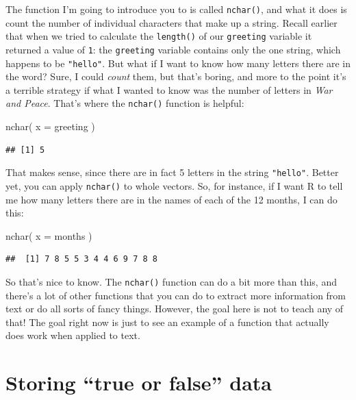 \documentclass[
]{book}
\newenvironment{Shaded}{\begin{snugshade}}{\end{snugshade}}
\newcommand{\AttributeTok}[1]{\textcolor[rgb]{0.77,0.63,0.00}{#1}}
\newcommand{\FunctionTok}[1]{\textcolor[rgb]{0.00,0.00,0.00}{#1}}
\newcommand{\NormalTok}[1]{#1}
\begin{document}
The function I'm going to introduce you to is called \texttt{nchar()}, and what it does is count the number of individual characters that make up a string. Recall earlier that when we tried to calculate the \texttt{length()} of our \texttt{greeting} variable it returned a value of \texttt{1}: the \texttt{greeting} variable contains only the one string, which happens to be \texttt{"hello"}. But what if I want to know how many letters there are in the word? Sure, I could \emph{count} them, but that's boring, and more to the point it's a terrible strategy if what I wanted to know was the number of letters in \emph{War and Peace}. That's where the \texttt{nchar()} function is helpful:

\begin{Shaded}
\begin{Highlighting}[]
\FunctionTok{nchar}\NormalTok{( }\AttributeTok{x =}\NormalTok{ greeting )}
\end{Highlighting}
\end{Shaded}

\begin{verbatim}
## [1] 5
\end{verbatim}

That makes sense, since there are in fact 5 letters in the string \texttt{"hello"}. Better yet, you can apply \texttt{nchar()} to whole vectors. So, for instance, if I want R to tell me how many letters there are in the names of each of the 12 months, I can do this:

\begin{Shaded}
\begin{Highlighting}[]
\FunctionTok{nchar}\NormalTok{( }\AttributeTok{x =}\NormalTok{ months )}
\end{Highlighting}
\end{Shaded}

\begin{verbatim}
##  [1] 7 8 5 5 3 4 4 6 9 7 8 8
\end{verbatim}

So that's nice to know. The \texttt{nchar()} function can do a bit more than this, and there's a lot of other functions that you can do to extract more information from text or do all sorts of fancy things. However, the goal here is not to teach any of that! The goal right now is just to see an example of a function that actually does work when applied to text.

\hypertarget{logicals}{%
\section{Storing ``true or false'' data}\label{logicals}}
\end{document}
